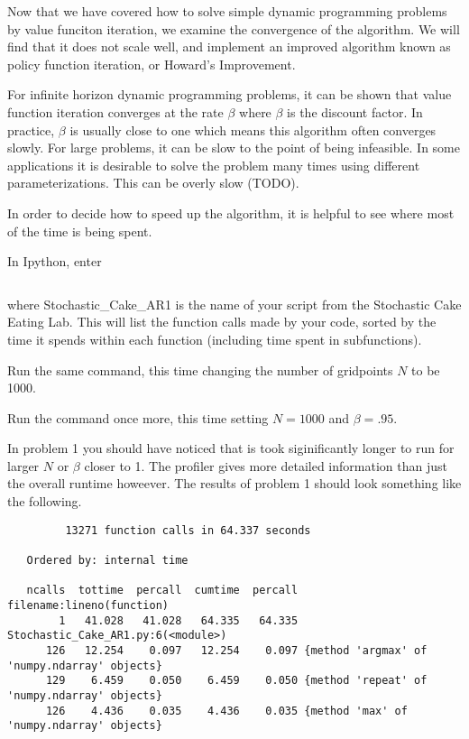 

Now that we have covered how to solve simple dynamic programming problems by value funciton iteration, we examine the convergence of the algorithm.  We will find that it does not scale well, and implement an improved algorithm known as policy function iteration, or Howard's Improvement.

For infinite horizon dynamic programming problems, it can be shown that value function iteration converges at the rate $\beta$ where $\beta$ is the discount factor.  In practice, $\beta$ is usually close to one which means this algorithm often converges slowly.  For large problems, it can be slow to the point of being infeasible.  In some applications it is desirable to solve the problem many times using different parameterizations.  This can be  overly slow (TODO).

In order to decide how to speed up the algorithm, it is helpful to see where most of the time is being spent.

\begin{problem}
In Ipython, enter
\begin{lstlisting}[style=python]
%run -p Stochastic_Cake_AR1 -s 'cumtime'
\end{lstlisting}
where Stochastic\_Cake\_AR1 is the name of your script from the Stochastic Cake Eating Lab.  This will list the function calls made by your code, sorted by the time it spends within each function (including time spent in subfunctions).

Run the same command, this time changing the number of gridpoints $N$ to be 1000.

Run the command once more, this time setting $N=1000$ and $\beta = .95$.
\end{problem}

In problem 1 you should have noticed that is took siginificantly longer to run for larger $N$ or $\beta$ closer to 1.  The profiler gives more detailed information than just the overall runtime howeever.  The results of problem 1 should look something like the following.

\begin{lstlisting}[style=python]
%run -p Stochastic_Cake_AR1.py -s "cumtime"
         13271 function calls in 64.337 seconds

   Ordered by: internal time

   ncalls  tottime  percall  cumtime  percall filename:lineno(function)
        1   41.028   41.028   64.335   64.335 Stochastic_Cake_AR1.py:6(<module>)
      126   12.254    0.097   12.254    0.097 {method 'argmax' of 'numpy.ndarray' objects}
      129    6.459    0.050    6.459    0.050 {method 'repeat' of 'numpy.ndarray' objects}
      126    4.436    0.035    4.436    0.035 {method 'max' of 'numpy.ndarray' objects}
\end{lstlisting}


